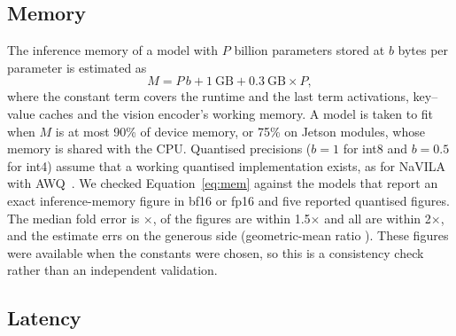 \documentclass[applsci,review,submit,pdftex,oneauthor]{Definitions/mdpi}
\begin{document}
\subsection{Memory}

The inference memory of a model with $P$ billion parameters stored at $b$ bytes per parameter is estimated as
\begin{equation}
M = P\,b + 1~\text{GB} + 0.3~\text{GB} \times P, \label{eq:mem}
\end{equation}
where the constant term covers the runtime and the last term activations, key--value caches and the vision encoder's working memory. A model is taken to fit when $M$ is at most 90\% of device memory, or 75\% on Jetson modules, whose memory is shared with the CPU. Quantised precisions ($b=1$ for int8 and $b=0.5$ for int4) assume that a working quantised implementation exists, as for NaVILA with AWQ~\cite{ax241204453,lin2024awq}. We checked Equation~\eqref{eq:mem} against the \memNbf{} models that report an exact inference-memory figure in bf16 or fp16 and five reported quantised figures. The median fold error is \memMed$\times$, \memWithinOneFive{} of the \memN{} figures are within 1.5$\times$ and all are within 2$\times$, and the estimate errs on the generous side (geometric-mean ratio \memBias). These figures were available when the constants were chosen, so this is a consistency check rather than an independent validation.

\subsection{Latency}
\end{document}
